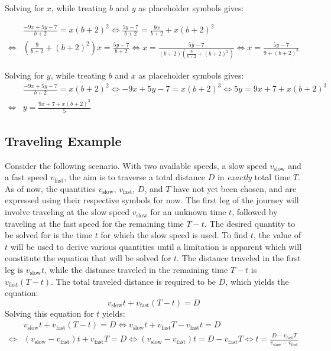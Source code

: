 \documentclass{article}
\begin{document}
Solving for \(x\), while treating \(b\) and \(y\) as placeholder symbols gives:

\begin{align*}
& \frac{-9x + 5y - 7}{b + 2} = x(b + 2)^2 
\iff \frac{5y - 7}{b + 2} = \frac{9x}{b + 2} + x(b + 2)^2 \\ 
\iff & \left(\frac{9}{b + 2} + (b + 2)^2\right)x = \frac{5y - 7}{b + 2} 
\iff x = \frac{5y - 7}{(b + 2)\left(\frac{9}{b + 2} + (b + 2)^2\right)} 
\iff x = \frac{5y - 7}{9 + (b + 2)^3} 
\end{align*}

Solving for \(y\), while treating \(b\) and \(x\) as placeholder symbols gives:
\begin{align*}
& \frac{-9x + 5y - 7}{b + 2} = x(b + 2)^2 
\iff -9x + 5y - 7 = x(b + 2)^3 
\iff 5y = 9x + 7 + x(b + 2)^3 \\
\iff & y = \frac{9x + 7 + x(b + 2)^3}{5}
\end{align*}


\subsection{Traveling Example}

Consider the following scenario. With two available speeds, a slow speed \(v_\text{slow}\) and a fast speed \(v_\text{fast}\), the aim is to traverse a total distance \(D\) in \emph{exactly} total time \(T\). As of now, the quantities \(v_\text{slow}\), \(v_\text{fast}\), \(D\), and \(T\) have not yet been chosen, and are expressed using their respective symbols for now. The first leg of the journey will involve traveling at the slow speed \(v_\text{slow}\) for an unknown time \(t\), followed by traveling at the fast speed for the remaining time \(T - t\). The desired quantity to be solved for is the time \(t\) for which the slow speed is used. To find \(t\), the value of \(t\) will be used to derive various quantities until a limitation is apparent which will constitute the equation that will be solved for \(t\). The distance traveled in the first leg is \(v_\text{slow} t\), while the distance traveled in the remaining time \(T - t\) is \(v_\text{fast}(T - t)\). The total traveled distance is required to be \(D\), which yields the equation: 
\[v_\text{slow} t + v_\text{fast}(T - t) = D\]
Solving this equation for \(t\) yields:
\begin{align*}
& v_\text{slow} t + v_\text{fast}(T - t) = D 
\iff v_\text{slow} t + v_\text{fast}T - v_\text{fast} t = D \\
\iff & (v_\text{slow} - v_\text{fast})t + v_\text{fast}T = D 
\iff (v_\text{slow} - v_\text{fast})t = D - v_\text{fast}T 
\iff t = \frac{D - v_\text{fast}T}{v_\text{slow} - v_\text{fast}}
\end{align*}
\end{document}
